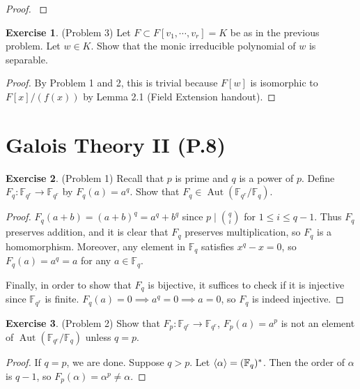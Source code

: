 \documentclass[12pt, psamsfonts]{amsart}
\theoremstyle{definition}
\newtheorem*{exer}{Exercise}
\theoremstyle{remark}
\DeclareMathOperator{\Aut}{Aut}
\numberwithin{equation}{section}
\begin{document}
\begin{proof}
  $ $
\end{proof}

\begin{exer}{(Problem 3)}
  Let $F \subset F[v_1, \cdots, v_r] = K$ be as in the previous problem.
  Let $w \in K$.
  Show that the monic irreducible polynomial of $w$ is separable.
\end{exer}

\begin{proof}
  By Problem 1 and 2, this is trivial because $F[w]$ is isomorphic to $F[x]/(f(x))$ by Lemma 2.1 (Field Extension handout).
\end{proof}

\section{Galois Theory II (P.8)}

\begin{exer}{(Problem 1)}
  Recall that $p$ is prime and $q$ is a power of $p$.
  Define $F_q: \mathbb{F}_{q^r} \rightarrow \mathbb{F}_{q^r}$ by $F_q(a) = a^q$.
  Show that $F_q \in \Aut(\mathbb{F}_{q^r}/\mathbb{F}_q)$.
\end{exer}

\begin{proof}
  $F_q(a + b) = (a + b)^q = a^q + b^q$ since $p \mid \binom{q}{i}$ for $1 \leq i \leq q - 1$.
  Thus $F_q$ preserves addition, and it is clear that $F_q$ preserves multiplication, so $F_q$ is a homomorphism.
  Moreover, any element in $\mathbb{F}_q$ satisfies $x^q - x = 0$, so $F_q(a) = a^q = a$ for any $a \in \mathbb{F}_q$.

  Finally, in order to show that $F_q$ is bijective, it suffices to check if it is injective since $\mathbb{F}_{q^r}$ is finite.
  $F_q(a) = 0 \implies a^q = 0 \implies a = 0$, so $F_q$ is indeed injective.
\end{proof}

\begin{exer}{(Problem 2)}
  Show that $F_p: \mathbb{F}_{q^r} \rightarrow \mathbb{F}_{q^r}$, $F_p(a) = a^p$ is not an element of $\Aut(\mathbb{F}_{q^r} / \mathbb{F}_q)$ unless $q = p$.
\end{exer}

\begin{proof}
  If $q = p$, we are done.
  Suppose $q > p$.
  Let $\ev{\alpha} = (\mathbb{F}_{q})^{*}$.
  Then the order of $\alpha$ is $q - 1$, so $F_p(\alpha) = \alpha^p \ne \alpha$.
\end{proof}
\end{document}
